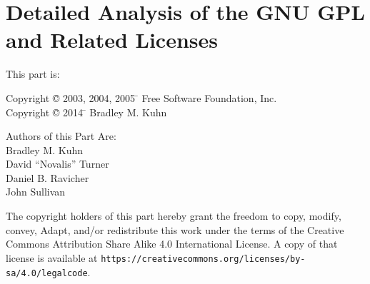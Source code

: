 %





\newcommand{\defn}[1]{\emph{#1}}

\part{Detailed Analysis of the GNU GPL and Related Licenses}

\begin{center}

{\parindent 0in
This part is: \\
\begin{tabbing}
Copyright \= \copyright{} 2003, 2004, 2005 \= \hspace{.2in} Free Software Foundation, Inc. \\
Copyright \= \copyright{} 2014 \= \hspace{.2in} Bradley M. Kuhn \\
\end{tabbing}

Authors of this Part Are: \\

Bradley M. Kuhn \\
David ``Novalis'' Turner \\
Daniel B. Ravicher \\
John Sullivan

\vspace{.3in}

The copyright holders of this part hereby grant the freedom to copy, modify,
convey, Adapt, and/or redistribute this work under the terms of the Creative
Commons Attribution Share Alike 4.0 International License.  A copy of that
license is available at
\verb=https://creativecommons.org/licenses/by-sa/4.0/legalcode=.  }

\end{center}

